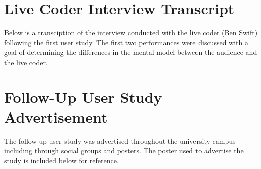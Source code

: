 \chapter{Live Coder Interview Transcript}
\label{appendix:live-coder-interview-transcript}

Below is a transciption of the interview conducted with the live coder (Ben Swift) following the first user study. The first two performances were discussed with a goal of determining the differences in the mental model between the audience and the live coder.




\chapter{Follow-Up User Study Advertisement}
\label{appendix:follow-up-user-study-advertisement}

The follow-up user study was advertised throughout the university campus including through social groups and posters. The poster used to advertise the study is included below for reference.

\begin{center}
\end{center}


